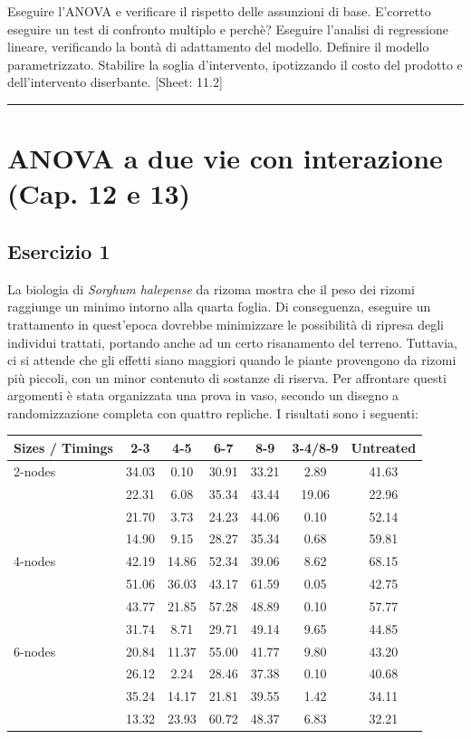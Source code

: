 \documentclass[a4paper,12pt,oneside]{book}
\begin{document}
Eseguire l'ANOVA e verificare il rispetto delle assunzioni di base. E'corretto eseguire un test di confronto multiplo e perchè? Eseguire l'analisi di regressione lineare, verificando la bontà di adattamento del modello. Definire il modello parametrizzato. Stabilire la soglia d'intervento, ipotizzando il costo del prodotto e dell'intervento diserbante.
{[}Sheet: 11.2{]}

\begin{center}\rule{0.5\linewidth}{0.5pt}\end{center}

\hypertarget{anova-a-due-vie-con-interazione-cap.-12-e-13}{%
\section{ANOVA a due vie con interazione (Cap. 12 e 13)}\label{anova-a-due-vie-con-interazione-cap.-12-e-13}}

\hypertarget{esercizio-1-8}{%
\subsection{Esercizio 1}\label{esercizio-1-8}}

La biologia di \emph{Sorghum halepense} da rizoma mostra che il peso dei rizomi raggiunge un minimo intorno alla quarta foglia. Di conseguenza, eseguire un trattamento in quest'epoca dovrebbe minimizzare le possibilità di ripresa degli individui trattati, portando anche ad un certo risanamento del terreno. Tuttavia, ci si attende che gli effetti siano maggiori quando le piante provengono da rizomi più piccoli, con un minor contenuto di sostanze di riserva. Per affrontare questi argomenti è stata organizzata una prova in vaso, secondo un disegno a randomizzazione completa con quattro repliche. I risultati sono i seguenti:

\begin{longtable}[]{@{}lcccccc@{}}
\toprule()
Sizes / Timings & 2-3 & 4-5 & 6-7 & 8-9 & 3-4/8-9 & Untreated \\
\midrule()
\endhead
2-nodes & 34.03 & 0.10 & 30.91 & 33.21 & 2.89 & 41.63 \\
& 22.31 & 6.08 & 35.34 & 43.44 & 19.06 & 22.96 \\
& 21.70 & 3.73 & 24.23 & 44.06 & 0.10 & 52.14 \\
& 14.90 & 9.15 & 28.27 & 35.34 & 0.68 & 59.81 \\
4-nodes & 42.19 & 14.86 & 52.34 & 39.06 & 8.62 & 68.15 \\
& 51.06 & 36.03 & 43.17 & 61.59 & 0.05 & 42.75 \\
& 43.77 & 21.85 & 57.28 & 48.89 & 0.10 & 57.77 \\
& 31.74 & 8.71 & 29.71 & 49.14 & 9.65 & 44.85 \\
6-nodes & 20.84 & 11.37 & 55.00 & 41.77 & 9.80 & 43.20 \\
& 26.12 & 2.24 & 28.46 & 37.38 & 0.10 & 40.68 \\
& 35.24 & 14.17 & 21.81 & 39.55 & 1.42 & 34.11 \\
& 13.32 & 23.93 & 60.72 & 48.37 & 6.83 & 32.21 \\
\bottomrule()
\end{longtable}
\end{document}
